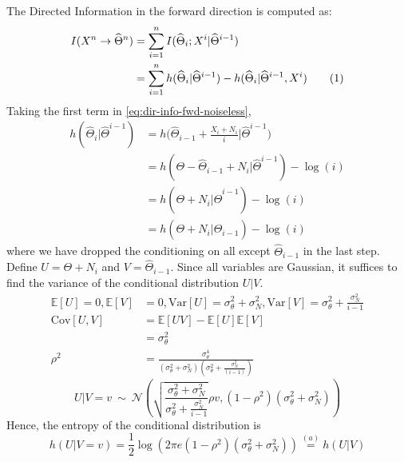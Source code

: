 \documentclass[conference]{IEEEtran}
\newcommand\numberthis{\stepcounter{equation}\tag{\theequation}}
\begin{document}
The Directed Information in the forward direction is computed as:
\begin{align*}
	I(X^n \rightarrow \widehat\Theta^n) &= \sum_{i=1}^n{I(\widehat\Theta_i ; X^i | \widehat\Theta^{i-1})} \\
										&= \sum_{i=1}^n{h(\widehat\Theta_i | \widehat\Theta^{i-1}) - h(\widehat\Theta_i | \widehat\Theta^{i-1}, X^i)} \numberthis \label{eq:dir-info-fwd-noiseless}
\end{align*}
Taking the first term in \eqref{eq:dir-info-fwd-noiseless},
\begin{align*}
	h(\widehat\Theta_i | \widehat\Theta^{i-1}) &= h \bigg( \widehat\Theta_{i-1} + \frac{X_i + N_i}{i} \bigg| \widehat\Theta^{i-1} \bigg) \\
											   &= h(\Theta - \widehat\Theta_{i-1} + N_i | \widehat\Theta^{i-1}) -\log(i) \\
											   &= h(\Theta + N_i | \widehat\Theta^{i-1}) -\log(i) \\
											   &= h(\Theta + N_i | \widehat\Theta_{i-1}) -\log(i)
\end{align*}
where we have dropped the conditioning on all except $\widehat\Theta_{i-1}$ in the last step. %
Define $U = \Theta + N_i$ and $V = \widehat\Theta_{i-1}$. Since all variables are Gaussian, it suffices to find the variance of the conditional distribution $U|V$.
\begin{align*}
	\mathbb{E}[U] = 0,
	\mathbb{E}[V] &= 0, \text{Var}[U] = \sigma_\theta^2 + \sigma_N^2,
	\text{Var}[V] = \sigma_\theta^2+ \frac{\sigma_N^2}{i-1} \\
	\text{Cov}[U,V] &= \mathbb{E}[UV]-\mathbb{E}[U]\mathbb{E}[V] \\
					&= \sigma_\theta^2 \\
	\rho^{2}        &= \frac{\sigma_{\theta}^{4}}{(\sigma_{\theta}^{2}+\sigma_{N}^{2})(\sigma_{\theta}^{2}+\frac{\sigma_{N}^{2}}{(i-1)})}
\end{align*}
\begin{equation*}
	U|V=v\ \sim\ \mathcal{N}\left(\sqrt{\frac{\sigma_{\theta}^{2}+\sigma_{N}^{2}}{\sigma_{\theta}^{2}+\frac{\sigma_{N}^{2}}{i-1}}}\rho v,(1-\rho^{2})(\sigma_{\theta}^{2}+\sigma_{N}^{2})\right)
\end{equation*}
Hence, the entropy of the conditional distribution is
\begin{equation*}
	h(U|V=v)=\frac{1}{2}\log(2\pi e(1-\rho^{2})(\sigma_{\theta}^{2}+\sigma_{N}^{2})) \overset{(a)}{=} h(U|V)
\end{equation*}
\end{document}
